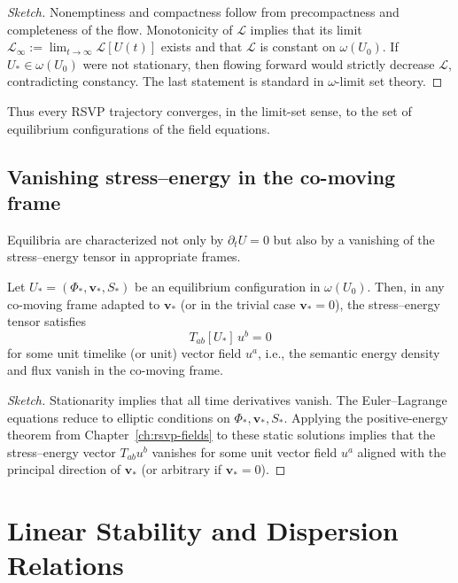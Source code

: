 \begin{proof}[Sketch]
Nonemptiness and compactness follow from precompactness and completeness of the
flow. Monotonicity of $\mathscr{L}$ implies that its limit
$\mathscr{L}_\infty := \lim_{t\to\infty}\mathscr{L}[U(t)]$ exists and that
$\mathscr{L}$ is constant on $\omega(U_0)$. If $U_\ast \in \omega(U_0)$ were
not stationary, then flowing forward would strictly decrease $\mathscr{L}$,
contradicting constancy. The last statement is standard in $\omega$-limit
set theory.
\end{proof}

Thus every RSVP trajectory converges, in the limit-set sense, to the set of
equilibrium configurations of the field equations.

\subsection{Vanishing stress--energy in the co-moving frame}

Equilibria are characterized not only by $\partial_t U=0$ but also by a
vanishing of the stress--energy tensor in appropriate frames.

\begin{proposition}
\label{prop:stress-co-moving}
Let $U_\ast = (\Phi_\ast,\mathbf{v}_\ast,S_\ast)$ be an equilibrium
configuration in $\omega(U_0)$. Then, in any co-moving frame adapted to
$\mathbf{v}_\ast$ (or in the trivial case $\mathbf{v}_\ast=0$), the
stress--energy tensor satisfies
\[
T_{ab}[U_\ast]\,u^b = 0
\]
for some unit timelike (or unit) vector field $u^a$, i.e., the semantic energy
density and flux vanish in the co-moving frame.
\end{proposition}

\begin{proof}[Sketch]
Stationarity implies that all time derivatives vanish. The Euler--Lagrange
equations reduce to elliptic conditions on $\Phi_\ast,\mathbf{v}_\ast,S_\ast$.
Applying the positive-energy theorem from Chapter~\ref{ch:rsvp-fields} to these
static solutions implies that the stress--energy vector $T_{ab} u^b$ vanishes
for some unit vector field $u^a$ aligned with the principal direction of
$\mathbf{v}_\ast$ (or arbitrary if $\mathbf{v}_\ast=0$).
\end{proof}

\section{Linear Stability and Dispersion Relations}

